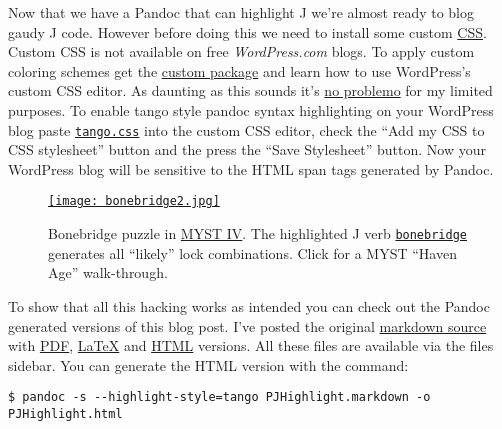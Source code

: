 Now that we have a Pandoc that can highlight J we're almost ready to
blog gaudy J code. However before doing this we need to install some
\captionsetup[floatingfigure]{labelformat=empty}
custom \href{http://www.htmldog.com/guides/cssbeginner/}{CSS}. Custom
CSS is not available on free \emph{WordPress.com} blogs. To apply custom
coloring schemes get the
\href{http://en.support.wordpress.com/custom-design/}{custom package}
and learn how to use WordPress's custom CSS editor. As daunting as this
sounds it's \href{http://www.youtube.com/watch?v=4QWfrxYt9DQ}{no
problemo} for my limited purposes. To enable tango style pandoc syntax
highlighting on your WordPress blog paste 
\href{https://www.box.com/s/dklf0lofp7pc1k98i3h2}{\texttt{tango.css}}
into the custom CSS editor, check the ``Add my CSS to CSS stylesheet'' button and
the press the ``Save Stylesheet'' button. Now your WordPress blog will
be sensitive to the HTML span tags generated by Pandoc.

\captionsetup[figure]{labelformat=empty}
\begin{SCfigure}
\centering
\href{http://www.youtube.com/watch?v=GW8zcbr9Zko}{\texttt{[image: bonebridge2.jpg]}}
\caption{Bonebridge puzzle in
\href{http://en.wikipedia.org/wiki/Myst\_IV:\_Revelation}{MYST IV}.
The highlighted J verb \href{https://www.box.com/s/zgnyhgsamlxbqvkw7r4t}{\texttt{bonebridge}} generates all ``likely'' lock combinations.
Click for a MYST ``Haven Age'' walk-through.}
\label{fig:3202X0}
\end{SCfigure}

To show that all this hacking works as intended you can check out the
Pandoc generated versions of this blog post. I've posted the original
\href{https://www.box.com/s/ld5l7y9v7ueo6ml37mqu}{markdown source} with
\href{https://www.box.com/s/0ogxgtmrrzicrn5o9o51}{PDF},
\href{https://www.box.com/s/zbcragtg35tgmciunnpp}{LaTeX} and
\href{https://www.box.com/s/q8lza89lf1s1s5161qkz}{HTML} versions. All
these files are available via the files sidebar. You can generate the
HTML version with the command:

\footnotesize
\begin{verbatim}
$ pandoc -s --highlight-style=tango PJHighlight.markdown -o PJHighlight.html
\end{verbatim}
\normalsize

